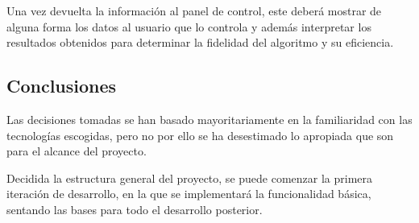         Una vez devuelta la información al panel de control, este deberá mostrar de alguna forma los datos al usuario que lo controla y además interpretar los resultados obtenidos para determinar la fidelidad del algoritmo y su eficiencia.        

        \subsection{Conclusiones}

        Las decisiones tomadas se han basado mayoritariamente en la familiaridad con las tecnologías escogidas, pero no por ello se ha desestimado lo apropiada que son para el alcance del proyecto.
        
        Decidida la estructura general del proyecto, se puede comenzar la primera iteración de desarrollo, en la que se implementará la funcionalidad básica, sentando las bases para todo el desarrollo posterior.